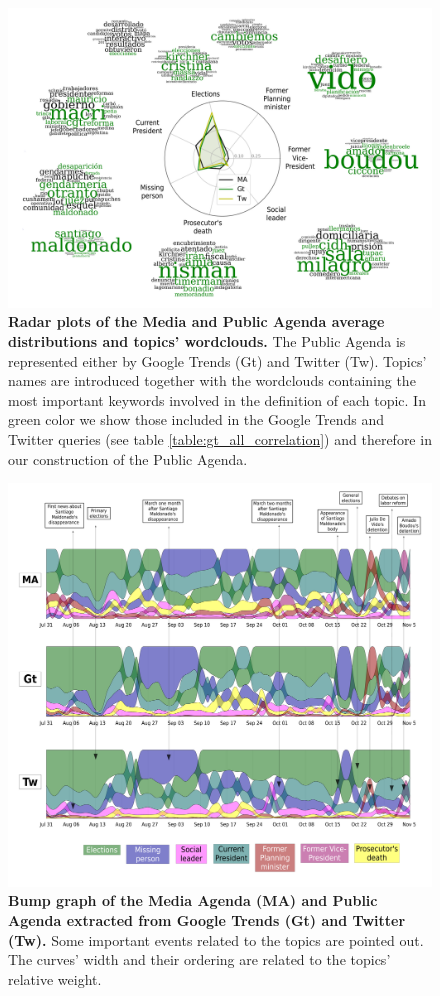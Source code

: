 \begin{figure}[h]
\centering
\includegraphics[width = \textwidth]{images/Fig1.pdf}
\caption{\textbf{Radar plots of the Media and Public Agenda average distributions and topics' wordclouds.} The Public Agenda is represented either by Google Trends (Gt) and Twitter (Tw). 
Topics’ names are introduced together with the wordclouds containing the most important keywords involved in the definition of each topic.
In green color we show those included in the Google Trends and Twitter queries (see table \ref{table:gt_all_correlation}) and therefore in our construction of the Public Agenda.
}
\label{fig:topics_wordclouds}
\end{figure}


\begin{figure}[h]
\includegraphics[width = \textwidth]{images/Fig2.pdf}
\caption{\textbf{Bump graph of the Media Agenda (MA) and Public Agenda extracted from Google Trends (Gt) and Twitter (Tw).} Some important events related to the topics are pointed out. The curves’ width and their ordering are related to the topics’ relative weight.}
\label{fig:all_agenda}
\end{figure}
 


